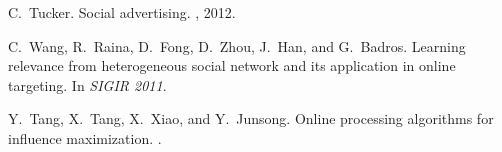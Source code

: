 \begin{thebibliography}{10}
\begin{scriptsize}
C.~Tucker.
\newblock Social advertising.
, 2012.

C.~Wang, R.~Raina, D.~Fong, D.~Zhou, J.~Han, and G.~Badros.
\newblock Learning relevance from heterogeneous social network and its
  application in online targeting.
\newblock In {\em SIGIR 2011}.

Y.~Tang, X.~Tang, X.~Xiao, and Y.~Junsong.
\newblock Online processing algorithms for influence maximization.
.


\end{scriptsize}

\end{thebibliography}
